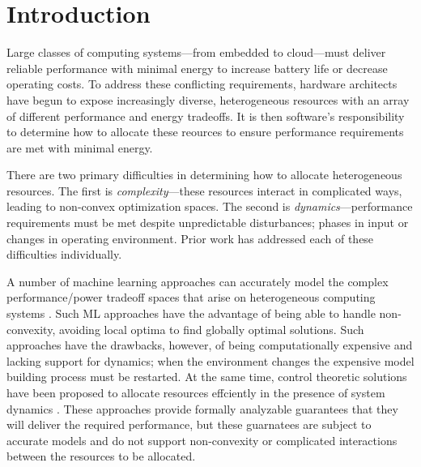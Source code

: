 \section{Introduction}
Large classes of computing systems---from embedded to cloud---must
deliver reliable performance with minimal energy to increase battery
life or decrease operating costs.  To address these conflicting
requirements, hardware architects have begun to expose increasingly
diverse, heterogeneous resources with an array of different
performance and energy tradeoffs.  It is then software's
responsibility to determine how to allocate these reources to ensure
performance requirements are met with minimal energy.


There are two primary difficulties in determining how to allocate
heterogeneous resources.  The first is \emph{complexity}---these
resources interact in complicated ways, leading to non-convex
optimization spaces.  The second is \emph{dynamics}---performance
requirements must be met despite unpredictable disturbances; \eg{}
phases in input or changes in operating environment.  Prior work has
addressed each of these difficulties individually.

A number of machine learning approaches can accurately model the
complex performance/power tradeoff spaces that arise on heterogeneous
computing systems
\cite{reddiHPCA2013,dubach2010,Bitirgen2008,Ipek,Koala,LEO,Flicker,Ponamarev}.
Such ML approaches have the advantage of being able to handle
non-convexity, avoiding local optima to find globally optimal
solutions.  Such approaches have the drawbacks, however, of being
computationally expensive and lacking support for dynamics; \ie{} when
the environment changes the expensive model building process must be
restarted.  At the same time, control theoretic solutions have been
proposed to allocate resources effciently in the presence of system
dynamics
\cite{Hellerstein2004a,Chen2011,PTRADE,POET,ControlWare,Agilos,grace2}.
These approaches provide formally analyzable guarantees that they will
deliver the required performance, but these guarnatees are subject to
accurate models and do not support non-convexity or complicated
interactions between the resources to be allocated.


